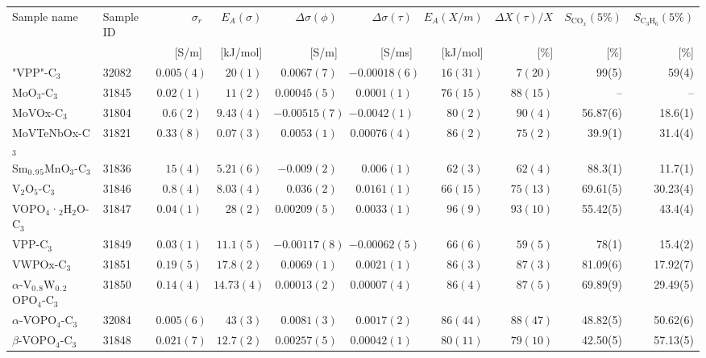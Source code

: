 \begin{tabular}{l|l|r|r|r|r|r|r|r|r}
Sample name & Sample ID & $\sigma_r$& $E_A(\sigma)$ & $\Delta \sigma (\phi)$ & $\Delta \sigma (\tau)$ & $E_A(X/m)$ & $\Delta X(\tau)/X$ & $S_{\mathrm{CO}_x}(5\%)$ & $S_{\mathrm{C}_3\mathrm{H}_6}(5\%)$\\
 & & [S/m] & [kJ/mol] & [S/m] & [S/ms] & [kJ/mol] & [\%] & [\%] & [\%]\\
\hline
"VPP"-C$_3$ & 32082 & $0.005(4)$ & $20(1)$ & $0.0067(7)$ & $-0.00018(6)$ & $16(31)$  & $7(20)$& 99(5) & 59(4)\\
MoO$_3$-C$_3$ & 31845 & $0.02(1)$ & $11(2)$ & $0.00045(5)$ & $0.0001(1)$ & $76(15)$  & $88(15)$& -- & --\\
MoVOx-C$_3$ & 31804 & $0.6(2)$ & $9.43(4)$ & $-0.00515(7)$ & $-0.0042(1)$ & $80(2)$  & $90(4)$& 56.87(6) & 18.6(1)\\
MoVTeNbOx-C$_3$ & 31821 & $0.33(8)$ & $0.07(3)$ & $0.0053(1)$ & $0.00076(4)$ & $86(2)$  & $75(2)$& 39.9(1) & 31.4(4)\\
Sm$_0$$_.$$_9$$_5$MnO$_3$-C$_3$ & 31836 & $15(4)$ & $5.21(6)$ & $-0.009(2)$ & $0.006(1)$ & $62(3)$  & $62(4)$& 88.3(1) & 11.7(1)\\
V$_2$O$_5$-C$_3$ & 31846 & $0.8(4)$ & $8.03(4)$ & $0.036(2)$ & $0.0161(1)$ & $66(15)$  & $75(13)$& 69.61(5) & 30.23(4)\\
VOPO$_4$·$_2$H$_2$O-C$_3$ & 31847 & $0.04(1)$ & $28(2)$ & $0.00209(5)$ & $0.0033(1)$ & $96(9)$  & $93(10)$& 55.42(5) & 43.4(4)\\
VPP-C$_3$ & 31849 & $0.03(1)$ & $11.1(5)$ & $-0.00117(8)$ & $-0.00062(5)$ & $66(6)$  & $59(5)$& 78(1) & 15.4(2)\\
VWPOx-C$_3$ & 31851 & $0.19(5)$ & $17.8(2)$ & $0.0069(1)$ & $0.0021(1)$ & $86(3)$  & $87(3)$& 81.09(6) & 17.92(7)\\
$\alpha$-V$_0$$_.$$_8$W$_0$$_.$$_2$OPO$_4$-C$_3$ & 31850 & $0.14(4)$ & $14.73(4)$ & $0.00013(2)$ & $0.00007(4)$ & $86(4)$  & $87(5)$& 69.89(9) & 29.49(5)\\
$\alpha$-VOPO$_4$-C$_3$ & 32084 & $0.005(6)$ & $43(3)$ & $0.0081(3)$ & $0.0017(2)$ & $86(44)$  & $88(47)$& 48.82(5) & 50.62(6)\\
$\beta$-VOPO$_4$-C$_3$ & 31848 & $0.021(7)$ & $12.7(2)$ & $0.00257(5)$ & $0.00042(1)$ & $80(11)$  & $79(10)$& 42.50(5) & 57.13(5)\\
\hline
\end{tabular}